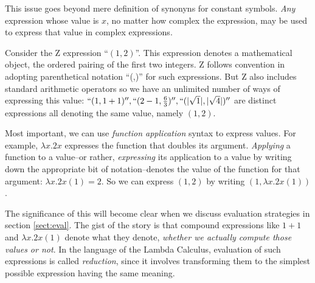 \documentclass[12pt]{tufte-handout}
\numberwithin{equation}{subsection}
\numberwithin{equation}{subsection}
\begin{document}
This issue goes beyond mere definition of synonyns for constant
symbols.  \textit{Any} expression whose value is \(x\), no matter how
complex the expression, may be used to express that value in complex
expressions.


Consider the Z expression ``\((1,2)\)''.  This expression denotes a
mathematical object, the ordered pairing of the first two integers.  Z
follows convention in adopting parenthetical notation ``(,)'' for such
expressions.  But Z also includes standard arithmetic operators so we
have an unlimited number of ways of expressing this value:
\(``(1,1+1)'', ``(2-1,\frac{6}{3})'', ``(|\sqrt{1}|,|\sqrt{4}|)''\)
are distinct expressions all denoting the same value, namely
\((1,2)\).

Most important, we can use \textit{function application} syntax to
express values.  For example, \(\lambda x.2x\) expresses the function
that doubles its argument.  \textit{Applying} a function to a
value--or rather, \textit{expressing} its application to a value by
writing down the appropriate bit of notation--denotes the value of the
function for that argument: \(\lambda x.2x(1) = 2\).  So we can
express \((1,2)\) by writing \((1,\lambda x.2x(1))\).

The significance of this will become clear when we discuss evaluation
strategies in section \ref{sect:eval}.  The gist of the story is that
compound expressions like \(1+1\) and \(\lambda x.2x(1)\) denote what
they denote, \textit{whether we actually compute those values or not}.
In the language of the Lambda Calculus, evaluation of such expressions
is called \textit{reduction}, since it involves transforming them to
the simplest possible expression having the same
meaning.
\end{document}

